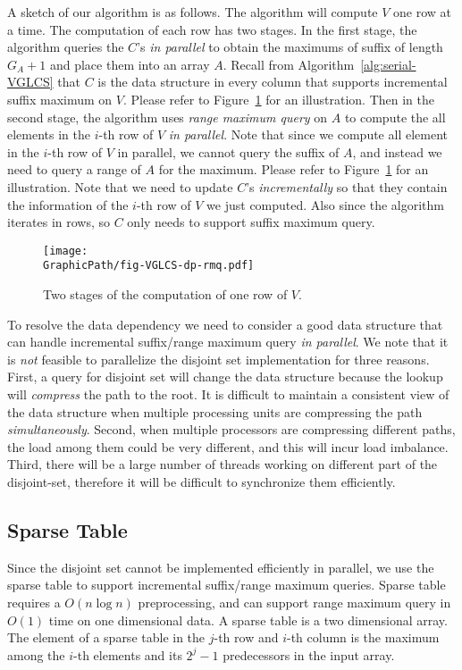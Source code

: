A sketch of our algorithm is as follows.  The algorithm will compute
$V$ one row at a time.  The computation of each row has two stages.
In the first stage, the algorithm queries the $C$'s {\em in parallel}
to obtain the maximums of suffix of length $G_A + 1$ and place them
into an array $A$.  Recall from Algorithm~\ref{alg:serial-VGLCS} that
$C$ is the data structure in every column that supports incremental
suffix maximum on $V$.  Please refer to
Figure~\ref{fig:fig-VGLCS-dp-rmq} for an illustration.  Then in the
second stage, the algorithm uses {\em range maximum query} on $A$ to
compute the all elements in the $i$-th row of $V$ {\em in parallel}.
Note that since we compute all element in the $i$-th row of $V$ in
parallel, we cannot query the suffix of $A$, and instead we need to
query a range of $A$ for the maximum.  Please refer to
Figure~\ref{fig:fig-VGLCS-dp-rmq} for an illustration.  Note that we
need to update $C$'s {\em incrementally} so that they contain the
information of the $i$-th row of $V$ we just computed.  Also since the
algorithm iterates in rows, so $C$ only needs to support suffix
maximum query.

\begin{figure}
  \texttt{[image: \\GraphicPath/fig-VGLCS-dp-rmq.pdf]}
  \caption{Two stages of the computation of one row of $V$.}
  \label{fig:fig-VGLCS-dp-rmq}
\end{figure}

To resolve the data dependency we need to consider a good data
structure that can handle incremental suffix/range maximum query {\em
  in parallel}.  We note that it is {\em not} feasible to parallelize
the disjoint set implementation for three reasons.  First, a query for
disjoint set will change the data structure because the lookup will
{\em compress} the path to the root.  It is difficult to maintain a
consistent view of the data structure when multiple processing units
are compressing the path {\em simultaneously}.  Second, when multiple
processors are compressing different paths, the load among them could
be very different, and this will incur load imbalance. Third, there
will be a large number of threads working on different part of the
disjoint-set, therefore it will be difficult to synchronize them
efficiently.

\subsection{Sparse Table}

Since the disjoint set cannot be implemented efficiently in parallel,
we use the sparse table to support incremental suffix/range maximum
queries.  Sparse table~\cite{Berkman1993RecursiveSP} requires a $O(n
\log n)$ preprocessing, and can support range maximum query in $O(1)$
time on one dimensional data.  A sparse table is a two dimensional
array.  The element of a sparse table in the $j$-th row and $i$-th
column is the maximum among the $i$-th elements and its $2^j - 1$
predecessors in the input array.

